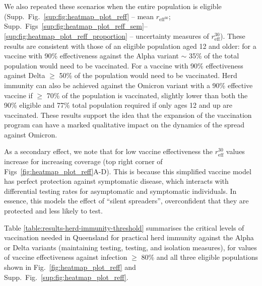 \documentclass[article, a4, authoryear]{elsarticle}
\begin{document}
We also repeated these scenarios when the entire population is eligible (Supp.~Fig.~\ref{sup:fig:heatmap_plot_reff} -- mean $r_{\mathrm{eff}^{30}}$;  Supp.~Figs~\ref{sup:fig:heatmap_plot_reff_sem}--\ref{sup:fig:heatmap_plot_reff_proportion} -- uncertainty measures of $r_{\mathrm{eff}}^{30}$). These results are consistent with those of an eligible population aged 12 and older: for a vaccine with 90\% effectiveness against the Alpha variant $\sim$ 35\% of the total population would need to be vaccinated. For a vaccine with 90\% effectiveness against Delta $\ge$ 50\% of the population would need to be vaccinated. Herd immunity can also be achieved against the Omicron variant with a 90\% effective vaccine if $\ge$ 70\% of the population is vaccinated, slightly lower than both the 90\% eligible and 77\% total population required if only ages 12 and up are vaccinated. These results support the idea that the expansion of the vaccination program can have a marked qualitative impact on the dynamics of the spread against Omicron. 

As a secondary effect, we note that for low vaccine effectiveness the $r^{30}_\mathrm{eff}$ values increase for increasing coverage (top right corner of Figs~\ref{fig:heatmap_plot_reff}A-D). This is because this simplified vaccine model has perfect protection against symptomatic disease, which interacts with differential testing rates for asymptomatic and symptomatic individuals. In essence, this models the effect of ``silent spreaders'', overconfident that they are protected and less likely to test. 

Table \ref{table:results-herd-immunity-threshold} summarises the critical levels of vaccination needed in Queensland for practical herd immunity against the Alpha or Delta variants (maintaining testing, testing, and isolation measures), for values of vaccine effectiveness against infection $\geq$ 80\%
and all three eligible populations shown in Fig.~\ref{fig:heatmap_plot_reff} and Supp.~Fig.~\ref{sup:fig:heatmap_plot_reff}. 
\end{document}
